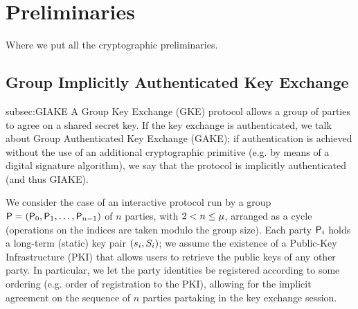 \section{Preliminaries}\label{sec:preliminaries}
Where we put all the cryptographic preliminaries.

\subsection{Group Implicitly Authenticated Key Exchange}{subsec:GIAKE}
A Group Key Exchange (GKE) protocol allows a group of parties to agree on a shared secret key. 
If the key exchange is authenticated, we talk about Group Authenticated Key Exchange (GAKE); if authentication is achieved without the use of an additional cryptographic primitive (e.g. by means of a digital signature algorithm), we say that the protocol is implicitly authenticated (and thus GIAKE).

We consider the case of an interactive protocol run by a group $\PartySet = (\Party_0,\allowbreak \Party_1,\dots,\Party_{n-1})$ of $n$ parties, with $2 < n \leq \projectKey$, arranged as a cycle (operations on the indices are taken modulo the group size).
Each party $\User[i]$ holds a long-term (static) key pair $(\ssk_i,\spk_i)$; we assume the existence of a Public-Key Infrastructure (PKI) that allows users to retrieve the public keys of any other party.
In particular, we let the party identities be registered according to some ordering (e.g. order of registration to the PKI), allowing for the implicit agreement on the sequence of $n$ parties partaking in the key exchange session.

